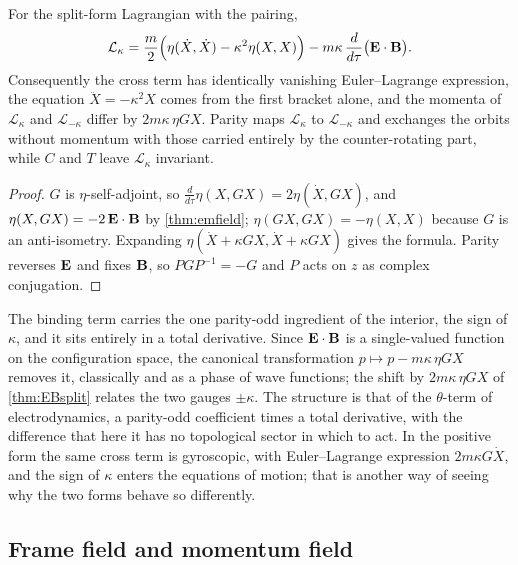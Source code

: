 \begin{theorem}
\label{thm:EBsplit}
For the split-form Lagrangian with the pairing,
\[
\mathcal L_\kappa=\frac m2\Bigl(\eta(\dot X,\dot X)-\kappa^2\eta(X,X)\Bigr)-m\kappa\,\frac{d}{d\tau}\bigl(\mathbf E\cdot\mathbf B\bigr).
\]
Consequently the cross term has identically vanishing Euler--Lagrange expression, the equation $\ddot X=-\kappa^2X$ comes from the first bracket
alone, and the momenta of $\mathcal L_\kappa$ and $\mathcal L_{-\kappa}$ differ by $2m\kappa\,\eta GX$. Parity maps $\mathcal L_\kappa$ to $\mathcal L_{-\kappa}$
and exchanges the orbits without momentum with those carried entirely by the counter-rotating part, while $C$ and $T$ leave $\mathcal L_\kappa$
invariant.
\end{theorem}

\begin{proof}
$G$ is $\eta$-self-adjoint, so $\tfrac{d}{d\tau}\eta(X,GX)=2\eta(\dot X,GX)$, and $\eta(X,GX)=-2\,\mathbf E\cdot\mathbf B$ by \cref{thm:emfield}; $\eta(GX,GX)=-\eta(X,X)$
because $G$ is an anti-isometry. Expanding $\eta(\dot X+\kappa GX,\dot X+\kappa GX)$ gives the formula. Parity reverses $\mathbf E$ and fixes $\mathbf B$, so
$PGP^{-1}=-G$ and $P$ acts on $z$ as complex conjugation.
\end{proof}

The binding term carries the one parity-odd ingredient of the interior, the sign of $\kappa$, and it sits entirely in a total derivative.
Since $\mathbf E\cdot\mathbf B$ is a single-valued function on the configuration space, the canonical transformation $p\mapsto p-m\kappa\,\eta GX$ removes it,
classically and as a phase of wave functions; the shift by $2m\kappa\,\eta GX$ of \cref{thm:EBsplit} relates the two gauges $\pm\kappa$. The structure is that of the $\theta$-term of electrodynamics, a parity-odd coefficient times a
total derivative, with the difference that here it has no topological sector in which to act. In the positive form the same cross term is
gyroscopic, with Euler--Lagrange expression $2m\kappa G\dot X$, and the sign of $\kappa$ enters the equations of motion; that is another way of
seeing why the two forms behave so differently.

\subsection{Frame field and momentum field}
\label{sec:framemomentum}

